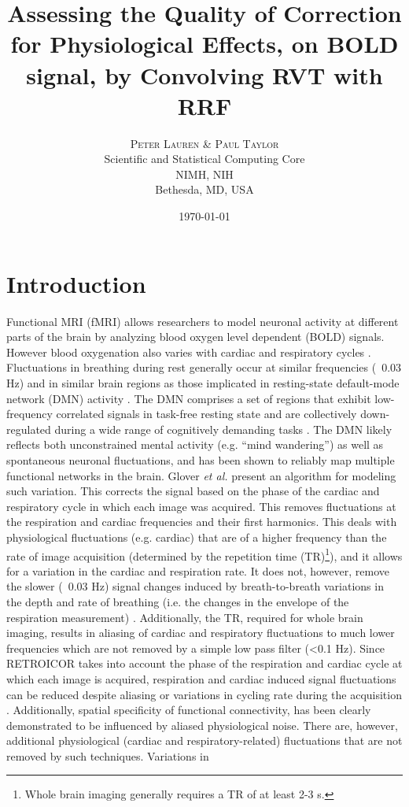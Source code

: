 \documentclass[twoside,twocolumn]{article}
\title{Assessing the Quality of Correction for Physiological Effects, on BOLD signal, by Convolving RVT with RRF} %
\author{%
\textsc{Peter Lauren \& Paul Taylor}\\ %
\normalsize Scientific and Statistical Computing Core \\ NIMH, NIH \\ Bethesda, MD, USA\\ %
}
\date{\today} %
\begin{document}
\maketitle
\onecolumn
\tableofcontents
\newpage
\twocolumn


\section{Introduction}

Functional MRI (fMRI) allows researchers to model neuronal activity at different parts of the brain by analyzing blood oxygen level dependent (BOLD) signals. However blood oxygenation also varies with cardiac and respiratory cycles  \cite{Glover2000}.  Fluctuations in breathing during rest generally occur at similar frequencies (~0.03 Hz) and in similar brain regions as those implicated in resting-state default-mode network (DMN) activity \cite{Wise2004}\cite{Birn2006}. The DMN comprises a set of regions that exhibit low-frequency correlated signals in task-free resting state \cite{Greicius2004} and are collectively down-regulated during a wide range of cognitively demanding tasks \cite{McKiernan2003}. The DMN likely reﬂects both unconstrained mental activity (e.g. ``mind wandering'') as well as spontaneous neuronal ﬂuctuations, and has been shown to reliably map multiple functional networks in the brain\cite{Birn2012}.  Glover {\em et al.}\cite{Glover2000} present an algorithm for modeling such variation. This corrects the signal based on the phase of the cardiac and respiratory cycle in which each image was acquired.  This removes fluctuations at the respiration and cardiac frequencies and their first harmonics.  This deals with physiological fluctuations (e.g. cardiac) that are of a higher frequency than the rate of image acquisition (determined by the repetition time (TR)\footnote{Whole brain imaging generally requires a TR of at least 2-3 s.}), and it allows for a variation in the cardiac and respiration rate. It does not, however, remove the slower (~0.03 Hz) signal changes induced by breath-to-breath variations in the depth and rate of breathing (i.e. the changes in the envelope of the respiration measurement) \cite{Birn2006}.  Additionally, the TR, required for whole brain imaging, results in aliasing of cardiac and respiratory ﬂuctuations to much lower frequencies which are not removed by a simple low pass filter (<0.1 Hz)\cite{Birn2012}. Since RETROICOR\cite{Glover2000} takes into account the phase of the respiration and cardiac cycle at which each image is acquired, respiration and cardiac induced signal ﬂuctuations can be reduced despite aliasing or variations in cycling rate during the acquisition \cite{Birn2012}.  Additionally, spatial speciﬁcity of functional connectivity, has been clearly demonstrated to be inﬂuenced by aliased physiological noise\cite{Lowe1998}.  There are, however, additional physiological (cardiac and respiratory-related) ﬂuctuations that are not removed by such techniques. Variations in 
\end{document}
